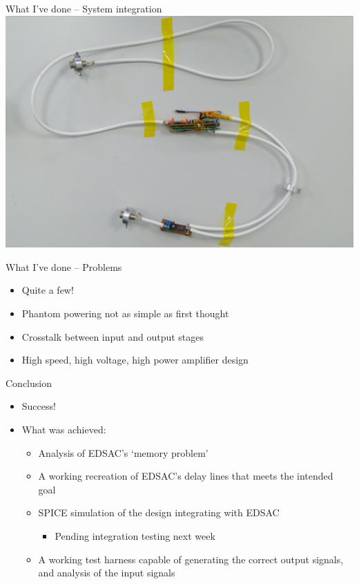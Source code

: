 \documentclass[aspectratio=169,11pt, xcolor={table}]{beamer}
\begin{document}
\begin{frame}{What I've done -- System integration}
	\centering
	\includegraphics[height=0.8\textheight]{figs/integrated}
\end{frame}

\begin{frame}{What I've done -- Problems}
	\begin{itemize}
		\item \alert{Quite a few!}
		\item Phantom powering not as simple as first thought
		\item Crosstalk between input and output stages
		\item High speed, high voltage, high power amplifier design
	\end{itemize}
\end{frame}

\begin{frame}{Conclusion}
	\begin{itemize}
		\item \alert{Success!}
		\item What was achieved:
		\begin{itemize}
		\item Analysis of EDSAC's `memory problem'
		\item A working recreation of EDSAC's delay lines that meets the intended goal
		\item SPICE simulation of the design integrating with EDSAC
		\begin{itemize}
			\item Pending integration testing next week
		\end{itemize}
		\item A working test harness capable of generating the correct output signals, and analysis of the input signals
		\end{itemize}
	\end{itemize}
\end{frame}
\end{document}

